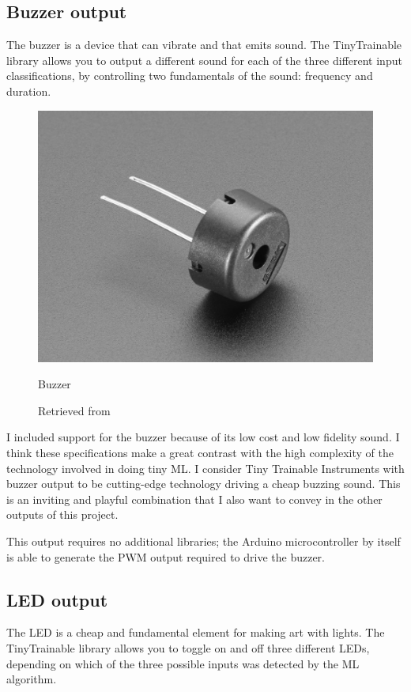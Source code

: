 \subsection{Buzzer output}

The buzzer is a device that can vibrate and that emits sound. The TinyTrainable library allows you to output a different sound for each of the three different input classifications, by controlling two fundamentals of the sound: frequency and duration.

\begin{figure}[ht]
  \centering
  \includegraphics[width=0.75\linewidth,height=0.25\textheight,keepaspectratio]{images/materials-adafruit-buzzer.jpg}
  \caption{Buzzer}
  \caption*{Retrieved from \cite{website-materials-adafruit-buzzer}}
  \label{fig:materials-adafruit-buzzer}
\end{figure}

I included support for the buzzer because of its low cost and low fidelity sound. I think these specifications make a great contrast with the high complexity of the technology involved in doing tiny \acrshort{ML}. I consider Tiny Trainable Instruments with buzzer output to be cutting-edge technology driving a cheap buzzing sound. This is an inviting and playful combination that I also want to convey in the other outputs of this project.

This output requires no additional libraries; the Arduino microcontroller by itself is able to generate the \acrfull{PWM} output required to drive the buzzer.

\subsection{LED output}

The \acrfull{LED} is a cheap and fundamental element for making art with lights. The TinyTrainable library allows you to toggle on and off three different LEDs, depending on which of the three possible inputs was detected by the \acrshort{ML} algorithm.

